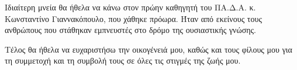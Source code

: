 \begin{preface}
Ιδιαίτερη μνεία θα ήθελα να κάνω στον πρώην καθηγητή του ΠΑ.Δ.Α. κ. Κωνσταντίνο Γιαννακόπουλο, που χάθηκε πρόωρα. Ήταν από εκείνους τους ανθρώπους που στάθηκαν εμπνευστές στο δρόμο της ουσιαστικής γνώσης.

Τέλος θα ήθελα να ευχαριστήσω την οικογένειά μου, καθώς και τους φίλους μου για τη συμμετοχή και τη συμβολή τους σε όλες τις στιγμές της ζωής μου.


\end{preface}